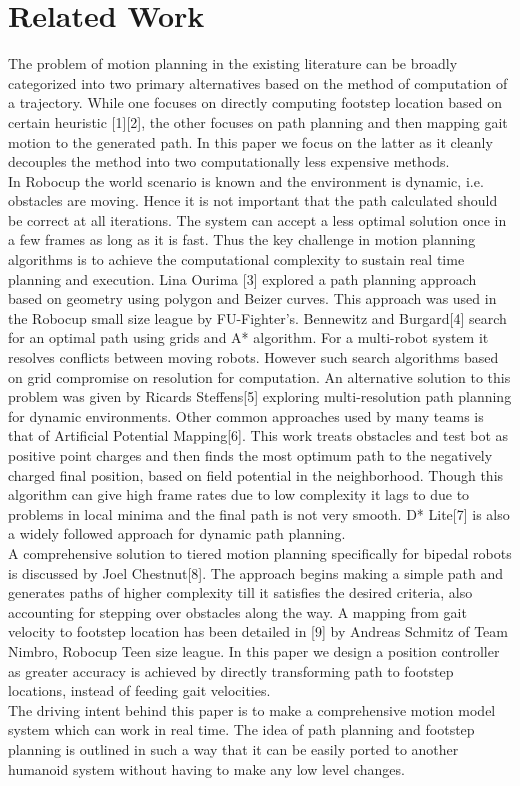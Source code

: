 \documentclass[letterpaper, 10 pt, conference]{ieeeconf}  %
\begin{document}
\section{Related Work}
The problem of motion planning in the existing literature can be broadly categorized into two primary alternatives based on the method of computation of a trajectory. While one focuses on directly computing footstep location based on certain heuristic [1][2], the other focuses on path planning and then mapping gait motion to the generated path. In this paper we focus on the latter as it cleanly decouples the method into two computationally less expensive methods.\\
In Robocup the world scenario is known and the environment is dynamic, i.e. obstacles are moving. Hence it is not important that the path calculated should be correct at all iterations. The system can accept a less optimal solution once in a few frames as long as it is fast. Thus the key challenge in motion planning algorithms is to achieve the computational complexity to sustain real time planning and execution.
Lina Ourima [3] explored a path planning approach based on geometry using polygon and Beizer curves. This approach was used in the Robocup small size league by FU-Fighter's. Bennewitz and Burgard[4] search for an optimal path using grids and A* algorithm. For a multi-robot system it resolves conflicts between moving robots. However such search algorithms based on grid compromise on resolution for computation. An alternative solution to this problem was given by Ricards Steffens[5] exploring multi-resolution path planning for dynamic environments. Other common approaches used by many teams is that of Artificial Potential Mapping[6]. This work treats obstacles and test bot as positive point charges and then finds the most optimum path to the negatively charged final position, based on field potential in the neighborhood. Though this algorithm can give high frame rates due to low complexity it lags to due to problems in local minima and the final path is not very smooth. D* Lite[7] is also a widely followed approach for dynamic path planning.\\
A comprehensive solution to tiered motion planning specifically for bipedal robots is discussed by Joel Chestnut[8]. The approach begins making a simple path and generates paths of higher complexity till it satisfies the desired criteria, also accounting for stepping over obstacles along the way. A mapping from gait velocity to footstep location has been detailed in [9] by Andreas Schmitz of Team Nimbro, Robocup Teen size league. In this paper we design a position controller as greater accuracy is achieved by directly transforming path to footstep locations, instead of feeding gait velocities.\\
The driving intent behind this paper is to make a comprehensive motion model system which can work in real time. The idea of path planning and footstep planning is outlined in such a way that it can be easily ported to another humanoid system without having to make any low level changes.
\end{document}
